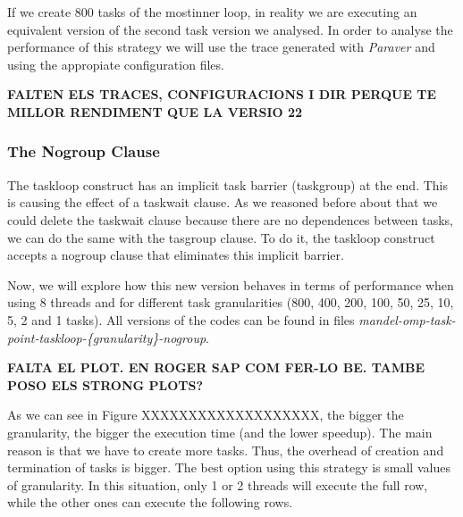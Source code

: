 \documentclass[12pt, a4paper]{article}
\begin{document}
If we create 800 tasks of the mostinner loop, in reality we are executing an equivalent version of the second task version we analysed. In order to analyse the performance of this strategy we will use the trace generated with \textit{Paraver} and using the appropiate configuration files.

\textbf{\large{\large{FALTEN ELS TRACES, CONFIGURACIONS I DIR PERQUE TE MILLOR RENDIMENT QUE LA VERSIO 22}}}

\subsubsection{The Nogroup Clause}

The taskloop construct has an implicit task barrier (taskgroup) at the end. This is causing the effect of a taskwait clause. As we reasoned before about that we could delete the taskwait clause because there are no dependences between tasks, we can do the same with the tasgroup clause. To do it, the taskloop construct accepts a nogroup clause that eliminates this implicit barrier.

Now, we will explore how this new version behaves in terms of performance when using 8 threads and for different task granularities (800, 400, 200, 100, 50, 25, 10, 5, 2 and 1 tasks). All versions of the codes can be found in files \textit{mandel-omp-task-point-taskloop-\{granularity\}-nogroup}.

\textbf{\large{\large{FALTA EL PLOT. EN ROGER SAP COM FER-LO BE. TAMBE POSO ELS STRONG PLOTS?}}}

As we can see in Figure XXXXXXXXXXXXXXXXXXX, the bigger the granularity, the bigger the execution time (and the lower speedup). The main reason is that we have to create more tasks. Thus, the overhead of creation and termination of tasks is bigger. The best option using this strategy is small values of granularity. In this situation, only 1 or 2 threads will execute the full row, while the other ones can execute the following rows.
\end{document}
